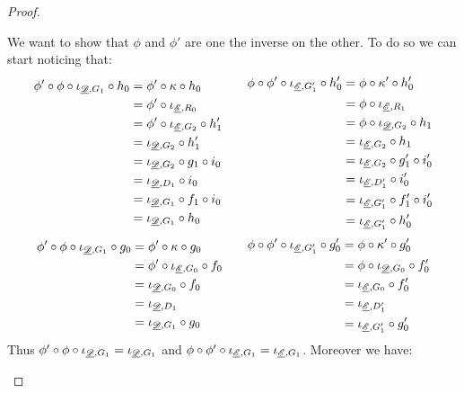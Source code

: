 \begin{proof}
\begin{enumerate}
	We want to show that $\phi$ and $\phi'$ are one the inverse on the other. To do so we can start noticing that:
	\[\begin{split}
		\phi'\circ\phi \circ  \iota_{\underline{\mathscr{D}}, G_1}\circ  h_0&=\phi'\circ \kappa\circ h_0\\&=\phi'\circ \iota_{\underline{\mathscr{E}}, R_0}\\&=\phi'\circ \iota_{\underline{\mathscr{E}}, G_2}\circ h'_1\\&=\iota_{\underline{\mathscr{D}}, G_2}\circ h'_1\\&=\iota_{\underline{\mathscr{D}}, G_2}\circ g_1\circ i_0\\&=\iota_{\underline{\mathscr{D}}, D_1}\circ i_0\\&=\iota_{\underline{\mathscr{D}}, G_1}\circ f_1\circ i_0\\&=\iota_{\underline{\mathscr{D}}, G_1}\circ h_0
	\end{split}\qquad \begin{split}
	\phi\circ\phi' \circ  \iota_{\underline{\mathscr{E}}, G'_1}\circ  h'_0&=\phi\circ \kappa'\circ h'_0\\&=\phi\circ \iota_{\underline{\mathscr{E}}, R_1}\\&=\phi\circ \iota_{\underline{\mathscr{D}}, G_2}\circ h_1\\&=\iota_{\underline{\mathscr{E}}, G_2}\circ h_1\\&=\iota_{\underline{\mathscr{E}}, G_2}\circ g'_1\circ i'_0\\&=\iota_{\underline{\mathscr{E}}, D'_1}\circ i'_0\\&=\iota_{\underline{\mathscr{E}}, G'_1}\circ f'_1\circ i'_0\\&=\iota_{\underline{\mathscr{E}}, G'_1}\circ h'_0
	\end{split}\]
		\[\begin{split}
		\phi'\circ\phi \circ  \iota_{\underline{\mathscr{D}}, G_1}\circ  g_0&=\phi'\circ \kappa\circ g_0\\&=\phi'\circ \iota_{\underline{\mathscr{E}}, G_0}\circ f_0\\&=\iota_{\underline{\mathscr{D}}, G_0}\circ f_0\\&=\iota_{\underline{\mathscr{D}}, D_1}\\&=\iota_{\underline{\mathscr{D}}, G_1}\circ g_0
	\end{split}\qquad \begin{split}	\phi\circ\phi' \circ  \iota_{\underline{\mathscr{E}}, G'_1}\circ  g'_0&=\phi\circ \kappa'\circ g'_0\\&=\phi\circ \iota_{\underline{\mathscr{D}}, G_0}\circ f'_0\\&=\iota_{\underline{\mathscr{E}}, G_0}\circ f'_0\\&=\iota_{\underline{\mathscr{E}}, D'_1}\\&=\iota_{\underline{\mathscr{E}}, G'_1}\circ g'_0
	\end{split}\]
	Thus $\phi'\circ \phi\circ  \iota_{\underline{\mathscr{D}}, G_1}=\iota_{\underline{\mathscr{D}}, G_1}$ and $\phi\circ \phi'\circ \iota_{\underline{\mathscr{E}}, G_1}=\iota_{\underline{\mathscr{E}}, G_1}$. Moreover we have:
	

\end{enumerate}
\end{proof}
